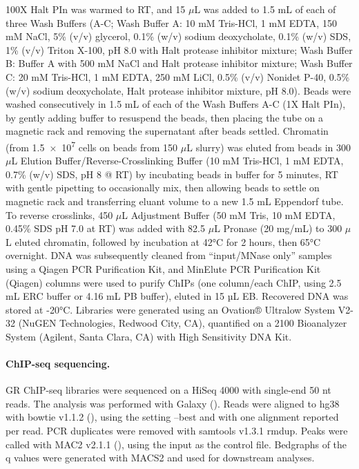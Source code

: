 \documentclass{article}
\begin{document}
{100X Halt PIn was warmed to RT, and 15 $\mu$L was added to 1.5 mL of each of three Wash Buffers (A-C; Wash Buffer A: 10 mM Tris-HCl, 1 mM EDTA, 150 mM NaCl, 5\% (v/v) glycerol, 0.1\% (w/v) sodium deoxycholate, 0.1\% (w/v) SDS, 1\% (v/v) Triton X-100, pH 8.0 with Halt protease inhibitor mixture; Wash Buffer B: Buffer A with 500 mM NaCl and Halt protease inhibitor mixture; Wash Buffer C: 20 mM Tris-HCl, 1 mM EDTA, 250 mM LiCl, 0.5\% (v/v) Nonidet P-40, 0.5\% (w/v) sodium deoxycholate, Halt protease inhibitor mixture, pH 8.0). Beads were washed consecutively in 1.5 mL of each of the Wash Buffers A-C (1X Halt PIn), by gently adding buffer to resuspend the beads, then placing the tube on a magnetic rack and removing the supernatant after beads settled. Chromatin (from \num{1.5e7} cells on beads from 150 $\mu$L slurry) was eluted from beads in 300 $\mu$L Elution Buffer/Reverse-Crosslinking Buffer (10 mM Tris-HCl, 1 mM EDTA, 0.7\% (w/v) SDS, pH 8 @ RT) by incubating beads in buffer for 5 minutes, RT with gentle pipetting to occasionally mix, then allowing beads to settle on magnetic rack and transferring eluant volume to a new 1.5 mL Eppendorf tube. To reverse crosslinks, 450 $\mu$L Adjustment Buffer (50 mM Tris, 10 mM EDTA, 0.45\% SDS pH 7.0 at RT) was added with 82.5 $\mu$L Pronase (20 mg/mL) to 300 $\mu$L eluted chromatin, followed by incubation at 42°C for 2 hours, then 65°C overnight. DNA was subsequently cleaned from “input/MNase only” samples using a Qiagen PCR Purification Kit, and MinElute PCR Purification Kit (Qiagen) columns were used to purify ChIPs (one column/each ChIP, using 2.5 mL ERC buffer or 4.16 mL PB buffer), eluted in 15 µL EB. Recovered DNA was stored at -20°C. Libraries were generated using an Ovation® Ultralow System V2-32 (NuGEN Technologies, Redwood City, CA), quantified on a 2100 Bioanalyzer System (Agilent, Santa Clara, CA) with High Sensitivity DNA Kit. 

\paragraph{ChIP-seq sequencing.} GR ChIP-seq libraries were sequenced on a HiSeq 4000 with single-end 50 nt reads. The analysis was performed with Galaxy (\cite{afgan_galaxy_2018}). Reads were aligned to hg38 with bowtie v1.1.2 (\cite{langmead_ultrafast_2009}), using the setting --best and with one alignment reported per read. PCR duplicates were removed with samtools v1.3.1 rmdup. Peaks were called with MAC2 v2.1.1 (\cite{zhang_model-based_2008}), using the input as the control file. Bedgraphs of the q values were generated with MACS2 and used for downstream analyses. 

}
\end{document}
